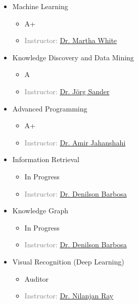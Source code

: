 \begin{multicols}{2}
\begin{itemize}
	\item {} Machine Learning
	\begin{itemize}
		\item A+
		\item \textcolor{gray}{Instructor: \href{http://webdocs.cs.ualberta.ca/~whitem/}{Dr. Martha White}}
	\end{itemize}

	\item {} Knowledge Discovery and Data Mining
	\begin{itemize}
		\item A 
		\item \textcolor{gray}{Instructor: \href{http://webdocs.cs.ualberta.ca/~joerg/}{Dr. Jörg Sander}}
	\end{itemize}
	
	\item {} Advanced Programming
	\begin{itemize}
		\item A+ 
		\item \textcolor{gray}{Instructor: \href{http://ee.aut.ac.ir/autcms/people/verticalPagesAjax/professorHomePage.htm?url=jahanshahi&depurl=electrical-engineering&lang=en&cid=50451496}{Dr. Amir Jahanshahi}}
		
	\end{itemize}

	\item {} Information Retrieval
	\begin{itemize}
		\item In Progress 
		\item \textcolor{gray}{Instructor: \href{https://sites.ualberta.ca/~denilson/}{Dr. Denilson Barbosa}}
	\end{itemize}

	\item {} Knowledge Graph
	\begin{itemize}
		\item In Progress 
		\item \textcolor{gray}{Instructor: \href{https://sites.ualberta.ca/~denilson/}{Dr. Denilson Barbosa}}
	\end{itemize}

	\item {} Visual Recognition (Deep Learning)
	\begin{itemize}
		\item Auditor 
		\item \textcolor{gray}{Instructor: \href{https://webdocs.cs.ualberta.ca/~nray1/}{Dr. Nilanjan Ray}}
	\end{itemize}
	
\end{itemize}
\end{multicols}


